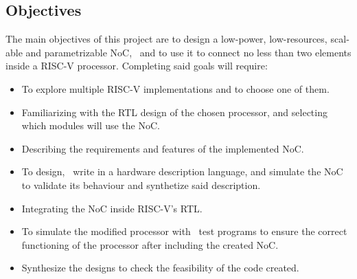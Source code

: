 \begin{otherlanguage}{english}
\addtocounter{chapter}{-1}
\chapter{Objectives}

The main objectives of this project are to design a low-power, low-resources, scalable and parametrizable NoC,  and to use it to connect no less than two elements inside a RISC-V processor. Completing said goals will require:

\begin{itemize}
    \item To explore multiple RISC-V implementations and to choose one of them.
    \item Familiarizing with the RTL design of the chosen processor, and selecting which modules will use the NoC.
    \item Describing the requirements and features of the implemented NoC.
    \item To design,  write in a hardware description language, and simulate the NoC to validate its behaviour and synthetize said description.
    \item Integrating the NoC inside RISC-V's RTL.
    \item To simulate the modified processor with  test programs to ensure the correct functioning of the processor after including the created NoC.
    \item Synthesize the designs to check the feasibility of the code created.
\end{itemize}
\end{otherlanguage}